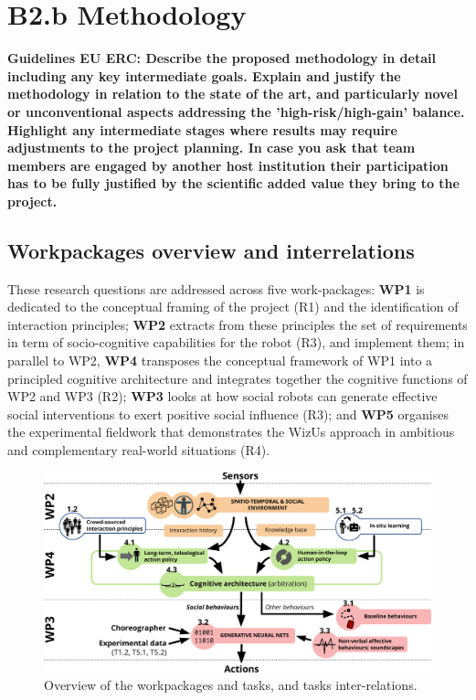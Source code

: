 \documentclass[11pt,a4paper]{report}
\newcommand{\project}{WizUs\xspace}
\newcommand{\eu}[1]{{\color{teal}\textbf{Guidelines EU ERC: #1}}}
\begin{document}


{\let\clearpage\relax\chapter{B2.b Methodology}\label{research-methodology}} %

\eu{Describe the proposed methodology in detail including any key intermediate
goals. Explain and justify the methodology in relation to the state of the art,
and particularly novel or unconventional aspects addressing the
'high-risk/high-gain' balance. Highlight any intermediate stages where results
may require adjustments to the project planning. In case you ask that team
members are engaged by another host institution their participation has to be
fully justified by the scientific added value they bring to the project.}


\section{Workpackages overview and interrelations}\label{workpackage-interrelations}


These research questions are addressed across five work-packages: \textbf{WP1}
is dedicated to the conceptual framing of the project (R1) and the
identification of interaction principles; \textbf{WP2} extracts from these
principles the set of requirements in term of socio-cognitive capabilities for
the robot (R3), and implement them; in parallel to WP2, \textbf{WP4} transposes
the conceptual framework of WP1 into a principled cognitive architecture and
integrates together the cognitive functions of WP2 and WP3 (R2); \textbf{WP3}
looks at how social robots can generate effective social interventions to exert
positive social influence (R3); and \textbf{WP5} organises the experimental
fieldwork that demonstrates the \project approach in ambitious and complementary
real-world situations (R4).



\begin{figure}[h!]
\centering
\includegraphics[width=\linewidth]{figs/archi}
\caption{Overview of the workpackages and tasks, and tasks inter-relations.}
\label{fig:archi}
\end{figure}
\end{document}
